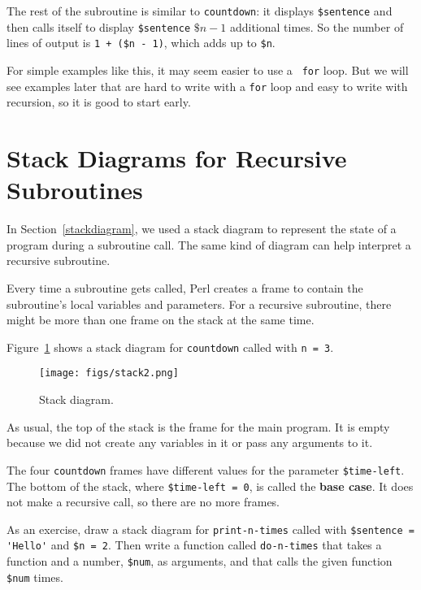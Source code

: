 
The rest of the subroutine is similar to {\tt countdown}: it 
displays {\tt \$sentence} and then calls itself to display 
{\tt \$sentence} $\$n - 1$ additional times.  So the number 
of lines of output is {\tt 1 + (\$n - 1)}, which
adds up to {\tt \$n}.

For simple examples like this, it may seem easier to use a {\tt
for} loop.  But we will see examples later that are hard to write
with a {\tt for} loop and easy to write with recursion, so it is
good to start early.


\section{Stack Diagrams for Recursive Subroutines}
\label{recursive.stack}

In Section~\ref{stackdiagram}, we used a stack diagram to represent
the state of a program during a subroutine call.  The same kind of
diagram can help interpret a recursive subroutine.

Every time a subroutine gets called, Perl creates a
frame to contain the subroutine's local variables and parameters.
For a recursive subroutine, there might be more than one frame 
on the stack at the same time.

Figure~\ref{fig.stack2} shows a stack diagram for {\tt countdown} called with
{\tt n = 3}.

\begin{figure}
\centerline
{\texttt{[image: figs/stack2.png]}}
\caption{Stack diagram.}
\label{fig.stack2}
\end{figure}


As usual, the top of the stack is the frame for the main 
program.
It is empty because we did not create any variables in 
it or pass any arguments to it.

The four {\tt countdown} frames have different values for the
parameter {\tt \$time-left}.  The bottom of the stack, where {\tt \$time-left = 0}, is
called the {\bf base case}.  It does not make a recursive call, so
there are no more frames.

As an exercise, draw a stack diagram for \verb"print-n-times" 
called with
\verb"$sentence = 'Hello'" and {\tt \$n = 2}.
Then write a function called \verb"do-n-times" that takes a function
and a number, {\tt \$num}, as arguments, and that calls
the given function {\tt \$num} times.
\label{do_n_times}

